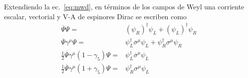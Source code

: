 Extendiendo la ec.~\eqref{eq:mwd}, en términos de los campos de Weyl una corriente escalar,  vectorial y V-A de espinores Dirac se escriben como
\begin{align}
\label{eq:8}
  \overline{\Psi}\Psi =& \left( \psi_R \right)^\dagger \psi_L+\left( \psi_L \right)^{\dagger}\psi_R \nonumber\\
  \overline{\Psi}\gamma^{\mu}\Psi=& \psi_L^{\dagger}\overline{\sigma}^{\mu}\psi_L+\psi_R^{\dagger}\sigma^{\mu}\psi_{R}\nonumber\\
  \tfrac{1}{2}\overline{\Psi}\gamma^{\mu}(1-\gamma_5)\Psi=& \psi_L^{\dagger}\overline{\sigma}^{\mu}\psi_L\nonumber\\
  \tfrac{1}{2}\overline{\Psi}\gamma^{\mu}(1+\gamma_5)\Psi=& \psi_R^{\dagger}{\sigma}^{\mu}\psi_L\nonumber\\
\end{align}

